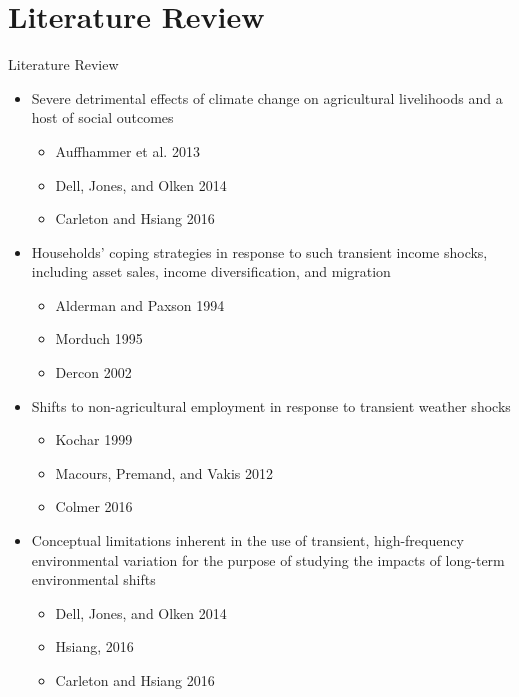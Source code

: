 \documentclass[10pt]{beamer}
\begin{document}
\section{Literature Review}
\begin{frame}
	{Literature Review}
	\begin{itemize}
		\item Severe detrimental effects of climate change on agricultural livelihoods and a host of social outcomes
		      \begin{itemize}
			      \item Auffhammer et al. 2013
			      \item Dell, Jones, and Olken 2014
			      \item Carleton and Hsiang 2016
		      \end{itemize}
		\item Households' coping strategies in response to such transient income shocks, including asset sales, income diversification, and migration
		      \begin{itemize}
			      \item Alderman and Paxson 1994
			      \item Morduch 1995
			      \item Dercon 2002
		      \end{itemize}
		\item Shifts to non-agricultural employment in response to transient weather shocks
		      \begin{itemize}
			      \item Kochar 1999
			      \item Macours, Premand, and Vakis 2012
			      \item Colmer 2016
		      \end{itemize}
		\item Conceptual limitations inherent in the use of transient, high-frequency environmental variation for the purpose of studying the impacts of long-term environmental shifts
		      \begin{itemize}
			      \item Dell, Jones, and Olken 2014
			      \item Hsiang, 2016
			      \item Carleton and Hsiang 2016
		      \end{itemize}
	\end{itemize}
\end{frame}

\end{document}
